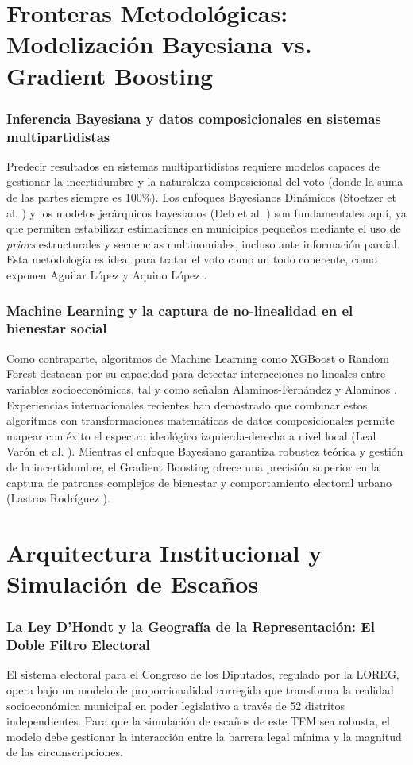 \section{Fronteras Metodológicas: Modelización Bayesiana vs. Gradient Boosting}

\subsubsection{Inferencia Bayesiana y datos composicionales en sistemas multipartidistas}
Predecir resultados en sistemas multipartidistas requiere modelos capaces de gestionar la incertidumbre y la naturaleza composicional del voto (donde la suma de las partes siempre es 100\%). Los enfoques Bayesianos Dinámicos (Stoetzer et al. \cite{stoetzer2019}) y los modelos jerárquicos bayesianos (Deb et al. \cite{deb2024}) son fundamentales aquí, ya que permiten estabilizar estimaciones en municipios pequeños mediante el uso de \textit{priors} estructurales y secuencias multinomiales, incluso ante información parcial. Esta metodología es ideal para tratar el voto como un todo coherente, como exponen Aguilar López y Aquino López \cite{aguilar2015}.

\subsubsection{Machine Learning y la captura de no-linealidad en el bienestar social}
Como contraparte, algoritmos de Machine Learning como XGBoost o Random Forest destacan por su capacidad para detectar interacciones no lineales entre variables socioeconómicas, tal y como señalan Alaminos-Fernández y Alaminos \cite{alaminos2023}. Experiencias internacionales recientes han demostrado que combinar estos algoritmos con transformaciones matemáticas de datos composicionales permite mapear con éxito el espectro ideológico izquierda-derecha a nivel local (Leal Varón et al. \cite{leal2025}). Mientras el enfoque Bayesiano garantiza robustez teórica y gestión de la incertidumbre, el Gradient Boosting ofrece una precisión superior en la captura de patrones complejos de bienestar y comportamiento electoral urbano (Lastras Rodríguez \cite{lastras2024}).

\section{Arquitectura Institucional y Simulación de Escaños}

\subsubsection{La Ley D'Hondt y la Geografía de la Representación: El Doble Filtro Electoral}
El sistema electoral para el Congreso de los Diputados, regulado por la LOREG, opera bajo un modelo de proporcionalidad corregida que transforma la realidad socioeconómica municipal en poder legislativo a través de 52 distritos independientes. Para que la simulación de escaños de este TFM sea robusta, el modelo debe gestionar la interacción entre la barrera legal mínima y la magnitud de las circunscripciones.


